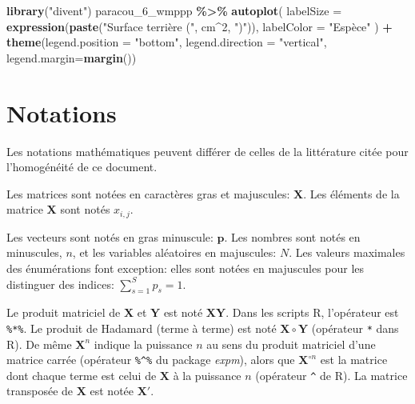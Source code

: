 \documentclass[
  11pt,
  american,
  a4paper,
  extrafontsizes,onecolumn,openright
  ]{memoir}
\newenvironment{Shaded}{\begin{snugshade}}{\end{snugshade}}
\newcommand{\AttributeTok}[1]{\textcolor[rgb]{0.13,0.29,0.53}{#1}}
\newcommand{\DecValTok}[1]{\textcolor[rgb]{0.00,0.00,0.81}{#1}}
\newcommand{\FunctionTok}[1]{\textcolor[rgb]{0.13,0.29,0.53}{\textbf{#1}}}
\newcommand{\NormalTok}[1]{#1}
\newcommand{\SpecialCharTok}[1]{\textcolor[rgb]{0.81,0.36,0.00}{\textbf{#1}}}
\newcommand{\StringTok}[1]{\textcolor[rgb]{0.31,0.60,0.02}{#1}}
\newlength{\rf}
\begin{document}
\begin{Shaded}
\begin{Highlighting}[]
\FunctionTok{library}\NormalTok{(}\StringTok{"divent"}\NormalTok{)}
\NormalTok{paracou\_6\_wmppp }\SpecialCharTok{\%\textgreater{}\%} 
\FunctionTok{autoplot}\NormalTok{(}
  \AttributeTok{labelSize =} \FunctionTok{expression}\NormalTok{(}\FunctionTok{paste}\NormalTok{(}\StringTok{"Surface terrière ("}\NormalTok{, cm}\SpecialCharTok{\^{}}\DecValTok{2}\NormalTok{, }\StringTok{")"}\NormalTok{)), }
  \AttributeTok{labelColor =} \StringTok{"Espèce"}
\NormalTok{) }\SpecialCharTok{+}
\FunctionTok{theme}\NormalTok{(}\AttributeTok{legend.position =} \StringTok{"bottom"}\NormalTok{, }\AttributeTok{legend.direction =} \StringTok{"vertical"}\NormalTok{, }\AttributeTok{legend.margin=}\FunctionTok{margin}\NormalTok{())}
\end{Highlighting}
\end{Shaded}

\normalsize

\chapter*{Notations}\label{notations}

Les notations mathématiques peuvent différer de celles de la littérature citée pour l'homogénéité de ce document.

Les matrices sont notées en caractères gras et majuscules: \(\mathbf{X}\).
Les éléments de la matrice \(\mathbf{X}\) sont notés \(x_{i,j}\).

Les vecteurs sont notés en gras minuscule: \(\mathbf{p}\).
Les nombres sont notés en minuscules, \(n\), et les variables aléatoires en majuscules: \(N\).
Les valeurs maximales des énumérations font exception: elles sont notées en majuscules pour les distinguer des indices: \(\sum_{s=1}^{S}{p_s}=1\).

Le produit matriciel de \(\mathbf{X}\) et \(\mathbf{Y}\) est noté \(\mathbf{X}\mathbf{Y}\). Dans les scripts R, l'opérateur est \texttt{\%*\%}.
Le produit de Hadamard (terme à terme) est noté \(\mathbf{X}\circ\mathbf{Y}\) (opérateur \texttt{*} dans R).
De même \(\mathbf{X}^n\) indique la puissance \(n\) au sens du produit matriciel d'une matrice carrée (opérateur \texttt{\%\^{}\%} du package \emph{expm}), alors que \(\mathbf{X}^{\circ n}\) est la matrice dont chaque terme est celui de \(\mathbf{X}\) à la puissance \(n\) (opérateur \texttt{\^{}} de R).
La matrice transposée de \(\mathbf{X}\) est notée \(\mathbf{X'}\).
\end{document}
